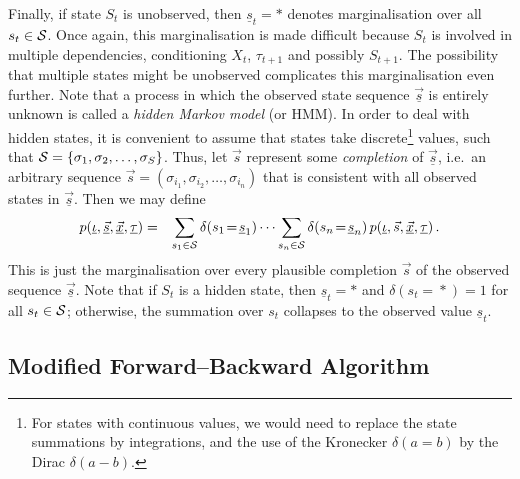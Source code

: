 \documentclass[a4paper]{article}
\begin{document}
Finally, if state $S_{t}$ is unobserved, then $\underline{s}_{t}=*$  denotes marginalisation over all $s_{t}\in{\cal S}$. 
Once again, this marginalisation is made difficult because $S_t$ is involved in multiple dependencies, conditioning $X_t$, $\tau_{t+1}$ and possibly $S_{t+1}$.
The possibility that multiple states might be unobserved complicates this marginalisation even further.
Note that a process in which the observed state sequence $\underline{\vec{s}}$ is entirely unknown is called a {\em hidden Markov model} (or HMM).
In order to deal with hidden states, it is convenient to assume that states take discrete\footnote{For states with continuous values, we would need to replace 
the state summations by integrations, and the use of the Kronecker $\delta(a\!=\!b)$ by the Dirac $\delta(a-b)$.} 
values, such that ${\cal S}=\left\{\sigma_1,\sigma_2,\ldots,\sigma_S\right\}$.
Thus, let $\vec{s}$ represent some {\em completion} of $\underline{\vec{s}}$, i.e.\ an arbitrary sequence $\vec{s}=(\sigma_{i_1},\sigma_{i_2},\ldots,\sigma_{i_n})$ that is consistent with all observed states in $\underline{\vec{s}}$.
Then we may define
\begin{eqnarray}
p(\underline{\iota},\underline{\vec{s}},\underline{\vec{x}},\underline{\tau}) & = &
\sum_{s_1\in{\cal S}}\delta(s_1\!=\!\underline{s}_1)
\cdots
\sum_{s_n\in{\cal S}}\delta(s_n\!=\!\underline{s}_n)
\,p(\underline{\iota},\vec{s},\underline{\vec{x}},\underline{\tau})\,.
\label{eq:state-marg}
\end{eqnarray}
This is just the marginalisation over every plausible completion $\vec{s}$ of the observed sequence $\underline{\vec{s}}$.
Note that if $S_t$ is a hidden state, then $\underline{s}_t=*$ and $\delta(s_t\!=\!*)=1$ for all $s_t\in{\cal S}$; otherwise, the summation over $s_t$ collapses to the observed value $\underline{s}_t$.


\subsection{Modified Forward--Backward Algorithm}\label{sec:forward-backward}
\end{document}
